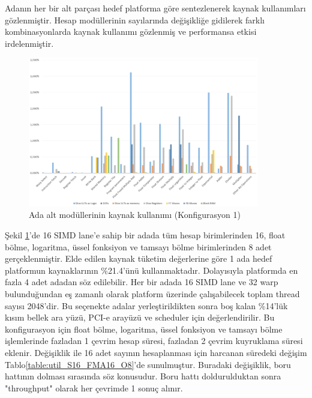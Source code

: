 Adanın her bir alt parçası hedef platforma göre sentezlenerek kaynak kullanımları gözlenmiştir. Hesap modüllerinin sayılarında değişikliğe gidilerek farklı kombinasyonlarda kaynak kullanımı gözlenmiş ve performansa etkisi irdelenmiştir.\par
\begin{figure}[ht]
\centering
\shorthandoff{=}
\includegraphics[width=0.9\textwidth]{gorsel/Util_S16_FMA16_O8.png}
\shorthandoff{=}
\caption{Ada alt modüllerinin kaynak kullanımı (Konfigurasyon 1)}
\label{image:util_S16_FMA16_O8}
\end{figure}
Şekil \ref{image:util_S16_FMA16_O8}'de 16 SIMD lane'e sahip bir adada tüm hesap birimlerinden 16, float bölme, logaritma, üssel fonksiyon ve tamsayı bölme birimlerinden 8 adet gerçeklenmiştir. Elde edilen kaynak tüketim değerlerine göre 1 ada hedef platformun kaynaklarının \%21.4'ünü kullanmaktadır. Dolayısıyla platformda en fazla 4 adet adadan söz edilebilir. Her bir adada 16 SIMD lane ve 32 warp bulunduğundan eş zamanlı olarak platform üzerinde çalışabilecek toplam thread sayısı 2048'dir. Bu seçenekte adalar yerleştirildikten sonra boş kalan \%14'lük kısım bellek ara yüzü, PCI-e arayüzü ve scheduler için değerlendirilir. Bu konfigurasyon için float bölme, logaritma, üssel fonksiyon ve tamsayı bölme işlemlerinde fazladan 1 çevrim hesap süresi, fazladan 2 çevrim kuyruklama süresi eklenir. Değişiklik ile 16 adet sayının hesaplanması için harcanan süredeki değişim Tablo\ref{table:util_S16_FMA16_O8}'de sunulmuştur. Buradaki değişiklik, boru hattının dolması sırasında söz konusudur. Boru hattı doldurulduktan sonra "throughput" olarak her çevrimde 1 sonuç alınır.\par 

